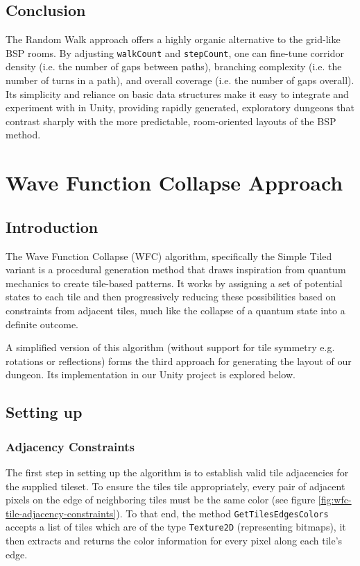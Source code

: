 \documentclass[a4paper, 12pt, one column, aas_macros]{article}
\begin{document}
\subsection{Conclusion}
The Random Walk approach offers a highly organic alternative to the grid-like BSP rooms. By adjusting \texttt{walkCount} and \texttt{stepCount}, one can fine-tune corridor density (i.e. the number of gaps between paths), branching complexity (i.e. the number of turns in a path), and overall coverage (i.e. the number of gaps overall). Its simplicity and reliance on basic data structures make it easy to integrate and experiment with in Unity, providing rapidly generated, exploratory dungeons that contrast sharply with the more predictable, room-oriented layouts of the BSP method.

\section{Wave Function Collapse Approach}
\subsection{Introduction}
The Wave Function Collapse (WFC) algorithm, specifically the Simple Tiled variant is a procedural generation method that draws inspiration from quantum mechanics to create tile-based patterns. It works by assigning a set of potential states to each tile and then progressively reducing these possibilities based on constraints from adjacent tiles, much like the collapse of a quantum state into a definite outcome. 

A simplified version of this algorithm (without support for tile symmetry e.g. rotations or reflections) forms the third approach for generating the layout of our dungeon. Its implementation in our Unity project is explored below.

\subsection{Setting up}
\subsubsection{Adjacency Constraints}
The first step in setting up the algorithm is to establish valid tile adjacencies for the supplied tileset. To ensure the tiles tile appropriately, every pair of adjacent pixels on the edge of neighboring tiles must be the same color (see figure \ref{fig:wfc-tile-adjacency-constraints}). To that end, the method \texttt{GetTilesEdgesColors} accepts a list of tiles which are of the type \texttt{Texture2D} (representing bitmaps), it then extracts and returns the color information for every pixel along each tile's edge.
\end{document}
